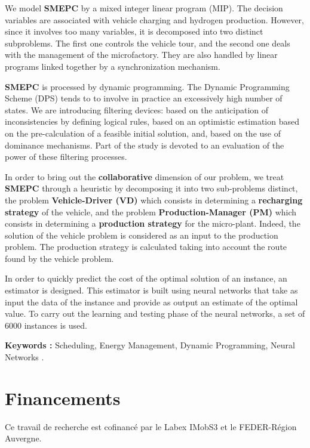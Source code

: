 \documentclass[11pt,a4paper]{report}
\begin{document}
We model \textbf{SMEPC} by a mixed integer linear program (MIP). The decision variables are associated with vehicle charging and hydrogen production. However, since it involves too many variables, it is decomposed into two distinct subproblems. The first one controls the vehicle tour, and the second one deals with the management of the microfactory. They are also handled by linear programs linked together by a synchronization mechanism.

\textbf{SMEPC} is processed by dynamic programming. The Dynamic Programming Scheme (DPS) tends to
to involve in practice an excessively high number of states. We are introducing
filtering devices: based on the anticipation of inconsistencies by defining logical rules, based on an optimistic estimation based on the pre-calculation of a feasible initial solution, and, based on the use of dominance mechanisms.
Part of the study is devoted to an evaluation of the power of these filtering processes.

In order to bring out the \textbf{collaborative} dimension of our problem, we treat \textbf{SMEPC} through a heuristic by decomposing it into two sub-problems
distinct, the problem \textbf{Vehicle-Driver (VD)} which consists in determining a \textbf{recharging strategy} of the vehicle, and the
problem \textbf{Production-Manager (PM)} which consists in determining a \textbf{production strategy} for the micro-plant. 
Indeed, the solution of the vehicle problem is considered as an input to the production problem. The
production strategy is calculated taking into account the route found by the vehicle problem.

In order to quickly predict the cost of the optimal solution of an instance, an estimator is designed. This estimator is built using neural networks that take as input the data of the instance and provide as output an estimate of the optimal value. To carry out the learning and testing phase of the neural networks, a set of 6000 instances is used.

\textbf{Keywords :}  Scheduling, Energy Management, Dynamic Programming, Neural Networks . 
\newpage
\chapter*{Financements}

Ce travail de recherche est cofinancé par le Labex IMobS3 et le FEDER-Région Auvergne.
\end{document}
